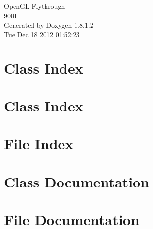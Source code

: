 \documentclass{book}
\begin{document}
\hypersetup{pageanchor=false,citecolor=blue}
\begin{titlepage}
\vspace*{7cm}
\begin{center}
{\Large Open\-G\-L Flythrough \\[1ex]\large 9001 }\\
\vspace*{1cm}
{\large Generated by Doxygen 1.8.1.2}\\
\vspace*{0.5cm}
{\small Tue Dec 18 2012 01:52:23}\\
\end{center}
\end{titlepage}
\clearemptydoublepage
{}
\tableofcontents
\clearemptydoublepage
{}
\hypersetup{pageanchor=true,citecolor=blue}
\chapter{Class Index}

\chapter{Class Index}

\chapter{File Index}

\chapter{Class Documentation}





















\chapter{File Documentation}







\printindex
\end{document}
